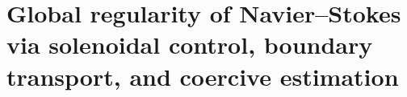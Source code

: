 \HMTFlushCurrentChapter
\chapter{Global regularity of Navier--Stokes via solenoidal control, boundary transport, and coercive estimation}
\begingroup
\renewcommand{\chapter}[2][]{}%

\endgroup

\HMTFlushCurrentChapter
\chapter{Quantum Existence and Yang--Mills Mass Gap via Gauge Coercivity and Spectral Positivity}
\begingroup
\renewcommand{\chapter}[2][]{}%

\endgroup


\HMTFlushCurrentChapter
\chapter{Algebraic realization of Hodge classes via compatible cohomological projectors and rational descent}
\begingroup
\renewcommand{\chapter}[2][]{}%

\endgroup

\HMTFlushCurrentChapter
\chapter{Rank, regulator, and leading term of Birch--Swinnerton--Dyer through determinantal memory of the arithmetic family}
\begingroup
\renewcommand{\chapter}[2][]{}%

\endgroup

